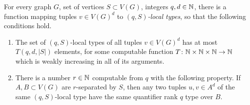 \begin{lemma}\label{pro:crossing}	
For
every graph $G$, set of vertices $S\subset V(G)$, integers $q,d\in\mathbb{N}$, 
there is a  function mapping tuples  $v\in V(G)^d$
	to \emph{$(q,S)$-local types},
so that the following conditions 
hold.
	 \begin{enumerate}[(1)]
	 	\item\label{c:number} The  set of  $(q,S)$-local types  of all tuples $v\in V(G)^d$  has at most
    $T(q,d,|S|)$ elements, for some computable function $T\colon \mathbb{N}\times \mathbb{N}\times\mathbb{N}\to \mathbb{N}$ which is weakly increasing in all of its arguments.

	
		

		
	 	\item\label{c:confusing}
		 	  There is a number 
		 $r\in\mathbb{N}$ computable from $q$ with the following property. 
		 If $A,B\subset V(G)$ are 
 $r$-separated by $S$,
then any two tuples $u,v\in A^d$
		 of the same $(q,S)$-local type
have
		 the same  quantifier rank $q$ type
		 over $B$.
	 \end{enumerate}
\end{lemma}

